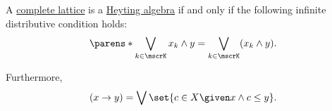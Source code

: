 \begin{proposition}\label{thm:complete_heyting_algebra}
  A \hyperref[def:complete_lattice]{complete lattice} is a \hyperref[def:heyting_algebra]{Heyting algebra} if and only if the following infinite distributive condition holds:
  \begin{equation}\label{eq:thm:complete_heyting_algebra/infinite_distributive}
    \parens*{ \bigvee_{k \in \mscrK} x_k } \wedge y = \bigvee_{k \in \mscrK} (x_k \wedge y).
  \end{equation}

  Furthermore,
  \begin{equation}\label{eq:thm:complete_heyting_algebra/relative_pseudocomplement}
    (x \rightarrow y) = \bigvee\set{ c \in X \given x \wedge c \leq y }.
  \end{equation}
\end{proposition}

